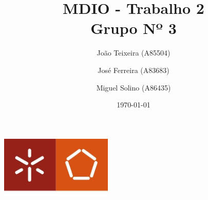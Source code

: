 \documentclass[a4paper]{report}
\begin{document}
\title{MDIO - Trabalho 2\\ 
\large Grupo Nº 3}
\author{João Teixeira (A85504) \and José Ferreira (A83683) \and Miguel Solino (A86435)}
\date{\today}

\begin{center}
    \begin{minipage}{0.75\linewidth}
        \centering
        \includegraphics[width=0.4\textwidth]{images/eng.jpeg}\par\vspace{1cm}
        \vspace{1.5cm}
        \href{https://www.uminho.pt/PT}
        {\color{black}{\scshape\LARGE Universidade do Minho}} \par
        \vspace{1cm}
        \href{https://www.di.uminho.pt/}
        {\color{black}{\scshape\Large Departamento de Informática}} \par
        \vspace{1.5cm}
        \maketitle
    \end{minipage}
\end{center}

\tableofcontents

\pagebreak
\end{document}
